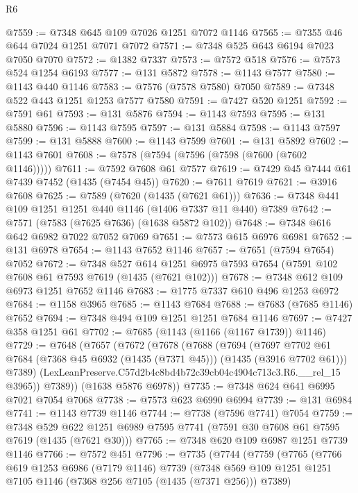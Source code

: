 \begin{lexlean}{R6}
\begin{coremodule}
@7559 := @7348 @645 @109 @7026 @1251 @7072 @1146
@7565 := @7355 @46 @644 @7024 @1251 @7071 @7072
@7571 := @7348 @525 @643 @6194 @7023 @7050 @7070
@7572 := @1382 @7337
@7573 := @7572 @518
@7576 := @7573 @524 @1254 @6193
@7577 := @131 @5872
@7578 := @1143 @7577
@7580 := @1143 @440 @1146
@7583 := @7576 (@7578 @7580) @7050
@7589 := @7348 @522 @443 @1251 @1253 @7577 @7580
@7591 := @7427 @520 @1251
@7592 := @7591 @61
@7593 := @131 @5876
@7594 := @1143 @7593
@7595 := @131 @5880
@7596 := @1143 @7595
@7597 := @131 @5884
@7598 := @1143 @7597
@7599 := @131 @5888
@7600 := @1143 @7599
@7601 := @131 @5892
@7602 := @1143 @7601
@7608 := @7578 (@7594 (@7596 (@7598 (@7600 (@7602 @1146)))))
@7611 := @7592 @7608 @61 @7577
@7619 := @7429 @45 @7444 @61 @7439 @7452 (@1435 (@7454 @45))
@7620 := @7611 @7619
@7621 := @3916 @7608
@7625 := @7589 (@7620 (@1435 (@7621 @61)))
@7636 := @7348 @441 @109 @1251 @1251 @440 @1146 (@1406 @7337 @11 @440) @7389
@7642 := @7571 (@7583 (@7625 @7636) (@1638 @5872 @102))
@7648 := @7348 @616 @642 @6982 @7022 @7052 @7069
@7651 := @7573 @615 @6976 @6981
@7652 := @131 @6978
@7654 := @1143 @7652 @1146
@7657 := @7651 (@7594 @7654) @7052
@7672 := @7348
    @527
    @614
    @1251
    @6975
    @7593
    @7654
    (@7591 @102 @7608 @61 @7593 @7619 (@1435 (@7621 @102)))
@7678 := @7348 @612 @109 @6973 @1251 @7652 @1146
@7683 := @1775 @7337 @610 @496 @1253 @6972
@7684 := @1158 @3965
@7685 := @1143 @7684
@7688 := @7683 (@7685 @1146) @7652
@7694 := @7348 @494 @109 @1251 @1251 @7684 @1146
@7697 := @7427 @358 @1251 @61
@7702 := @7685 (@1143 (@1166 (@1167 @1739)) @1146)
@7729 := @7648
    (@7657
      (@7672
        (@7678
          (@7688
            (@7694
              (@7697
                @7702
                @61
                @7684
                (@7368 @45 @6932 (@1435 (@7371 @45)))
                (@1435 (@3916 @7702 @61)))
              @7389)
            (LexLeanPreserve.C57d2b4c8bd4b72c39cb04c4904c713c3.R6.__rel_15 @3965))
          @7389))
      (@1638 @5876 @6978))
@7735 := @7348 @624 @641 @6995 @7021 @7054 @7068
@7738 := @7573 @623 @6990 @6994
@7739 := @131 @6984
@7741 := @1143 @7739 @1146
@7744 := @7738 (@7596 @7741) @7054
@7759 := @7348
    @529
    @622
    @1251
    @6989
    @7595
    @7741
    (@7591 @30 @7608 @61 @7595 @7619 (@1435 (@7621 @30)))
@7765 := @7348 @620 @109 @6987 @1251 @7739 @1146
@7766 := @7572 @451
@7796 := @7735
    (@7744
      (@7759
        (@7765
          (@7766
            @619
            @1253
            @6986
            (@7179 @1146)
            @7739
            (@7348 @569 @109 @1251 @1251 @7105 @1146 (@7368 @256 @7105 (@1435 (@7371 @256))) @7389)

\end{coremodule}
\end{lexlean}
